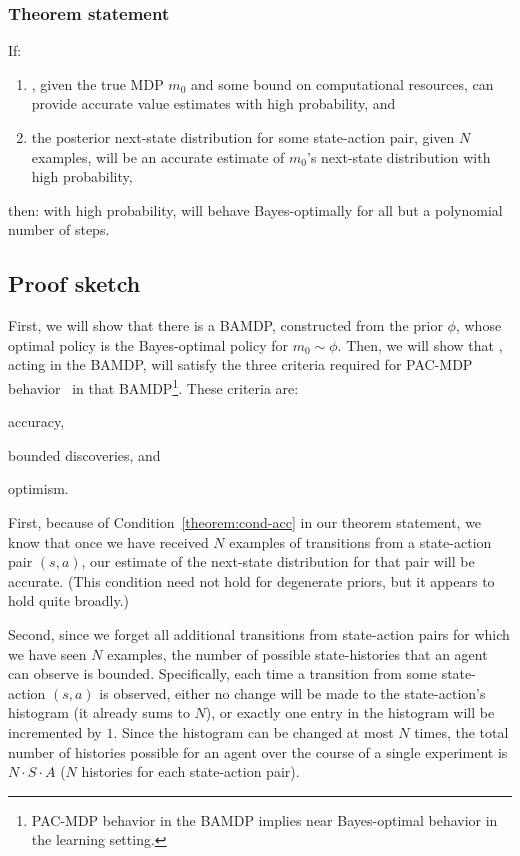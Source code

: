 \subsubsection{Theorem statement}

If:
\begin{enumerate}
\item \label{theorem:cond-fsss} , given the true MDP $m_0$ and some bound on computational resources, can provide accurate value estimates with high probability, and 
\item \label{theorem:cond-acc} the posterior next-state distribution for some state-action pair, given $N$ examples, will be an accurate estimate of $m_0$'s next-state distribution with high probability,
\end{enumerate}
then: with high probability,  will behave Bayes-optimally for all but a polynomial number of steps.

\subsection{Proof sketch}


First, we will show that there is a BAMDP, constructed from the prior $\phi$, whose optimal policy is the Bayes-optimal policy for $m_0\sim \phi$. Then, we will show that , acting in the BAMDP, will satisfy the three criteria required for PAC-MDP behavior~\cite{kakade03,lihong09abr2} in that BAMDP\footnote{PAC-MDP behavior in the BAMDP implies near Bayes-optimal behavior in the learning setting.}.
These criteria are: \begin{inparaenum} \item accuracy, \item bounded discoveries, and \item optimism. \end{inparaenum}

First, because of Condition~\ref{theorem:cond-acc} in our theorem statement, we know that once we have received $N$ examples of transitions from a state-action pair $(s,a)$, our estimate of the next-state distribution for that pair will be accurate.  (This condition need not hold for degenerate priors, but it appears to hold quite broadly.)

Second, since we forget all additional transitions from state-action pairs for which we have seen $N$ examples, the number of possible state-histories that an agent can observe is bounded.  Specifically, each time a transition from some state-action $(s,a)$ is observed, either no change will be made to the state-action's histogram (it already sums to $N$), or exactly one entry in the histogram will be incremented by $1$.  Since the histogram can be changed at most $N$ times, the total number of histories possible for an agent over the course of a single experiment is $N \cdot S \cdot A$ ($N$ histories for each state-action pair).


